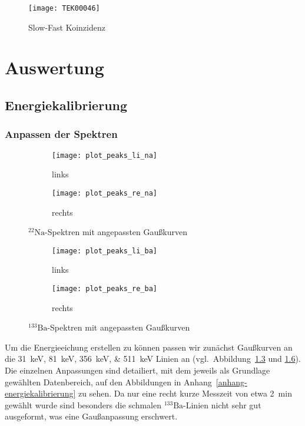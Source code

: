 \documentclass[11pt, ngerman, fleqn, DIV=15, headinclude, BCOR=2cm]{scrreprt}
\begin{document}
\begin{figure}
	\centering
	\texttt{[image: TEK00046]}
	\caption{%
		Slow-Fast Koinzidenz
	}
	\label{fig:ba_slow_fast_koinzidenz}
\end{figure}

\fehlt%

\chapter{Auswertung}
\section{Energiekalibrierung}

\subsection{Anpassen der Spektren}
\begin{figure}[h]
	\centering
	\begin{subfigure}{0.49 \textwidth}
		\texttt{[image: plot\_peaks\_li\_na]}
		\caption{%
			links
		}
		\label{fig:na_peaks-li_plot}
	\end{subfigure}
	\begin{subfigure}{0.49 \textwidth}
		\texttt{[image: plot\_peaks\_re\_na]}
		\caption{%
			rechts
		}
		\label{fig:na_peaks-re_plot}
	\end{subfigure}
	\caption{%
		$^{22}\text{Na}$-Spektren mit angepassten Gaußkurven
	}
	\label{fig:na_peaks_plot}
\end{figure}
\begin{figure}[h]
	\centering
	\begin{subfigure}{0.49 \textwidth}
		\texttt{[image: plot\_peaks\_li\_ba]}
		\caption{%
			links
		}
		\label{fig:ba_peaks-li_plot}
	\end{subfigure}
	\begin{subfigure}{0.49 \textwidth}
		\texttt{[image: plot\_peaks\_re\_ba]}
		\caption{%
			rechts
		}
		\label{fig:ba_peaks-re_plot}
	\end{subfigure}
	\caption{%
		$^{133}\text{Ba}$-Spektren mit angepassten Gaußkurven
	}
	\label{fig:ba_peaks_plot}
\end{figure}

Um die Energieeichung erstellen zu können passen wir zunächst Gaußkurven an die
\SIlist{31;81;356;511}{\kilo\electronvolt} Linien an (vgl.\
Abbildung~\ref{fig:na_peaks_plot} und \ref{fig:ba_peaks_plot}).
Die einzelnen Anpassungen sind detailiert, mit dem jeweils als Grundlage
gewählten Datenbereich, auf den Abbildungen in
Anhang~\ref{anhang-energiekalibrierung} zu sehen.
Da nur eine recht kurze Messzeit von etwa \SI{2}{\minute} gewählt wurde sind
besonders die schmalen $^{133}\text{Ba}$-Linien nicht sehr gut ausgeformt, was
eine Gaußanpassung erschwert.
\end{document}
